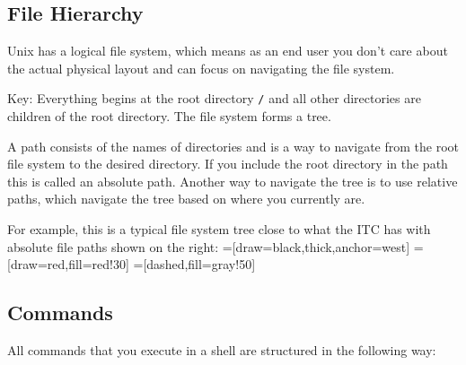 \documentclass[11pt]{cselabheader}
\begin{document}
\subsection{File Hierarchy}

Unix has a logical file system, which means as an end user you don't care about
the actual physical layout and can focus on navigating the file system.

Key: Everything begins at the root directory
\texttt{/} and all other directories are children of the root directory. The
file system forms a tree.

A path consists of the names of directories and is a way to navigate from the
root file system to the desired directory. If you include the root directory in
the path this is called an absolute path. Another way to navigate the tree is to
use relative paths, which navigate the tree based on where you currently are.

For example, this is a typical file system tree close to what the ITC has with
absolute file paths shown on the right:
=[draw=black,thick,anchor=west]
=[draw=red,fill=red!30]
=[dashed,fill=gray!50]


\subsection{Commands}

All commands that you execute in a shell are structured in the following way:
\end{document}
